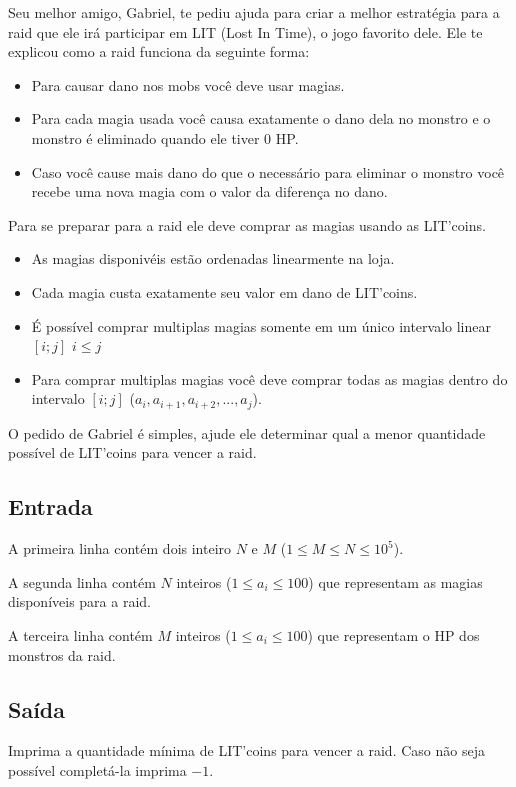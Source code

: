 Seu melhor amigo, Gabriel, te pediu ajuda para criar a melhor estratégia para a raid que ele irá participar em LIT (Lost In Time), o jogo favorito dele. Ele te explicou como a raid funciona da seguinte forma:

\begin{itemize}
    \item Para causar dano nos mobs você deve usar magias.
    \item Para cada magia usada você causa exatamente o dano dela no monstro e o monstro é eliminado quando ele tiver 0 HP.
    \item Caso você cause mais dano do que o necessário para eliminar o monstro você recebe uma nova magia com o valor da diferença no dano.
\end{itemize}

Para se preparar para a raid ele deve comprar as magias usando as LIT'coins.
\begin{itemize}
    \item As magias disponivéis estão ordenadas linearmente na loja.
    \item Cada magia custa exatamente seu valor em dano de LIT'coins.
    \item É possível comprar multiplas magias somente em um único intervalo linear $[i; j]$ $i \leq j$
    \item Para comprar multiplas magias você deve comprar todas as magias dentro do intervalo $[i; j]$ ($a_i, a_{i+1}, a_{i+2}, ..., a_j$).
\end{itemize}

O pedido de Gabriel é simples, ajude ele determinar qual a menor quantidade possível de LIT'coins para vencer a raid.

\subsection*{Entrada}
A primeira linha contém dois inteiro $N$ e $M$ ($1 \leq M \leq N \leq 10^5$).

A segunda linha contém $N$ inteiros ($1 \leq a_i \leq 100$) que representam as magias disponíveis para a raid.

A terceira linha contém $M$ inteiros ($1 \leq a_i \leq 100$) que representam o HP dos monstros da raid.

\subsection*{Saída}
Imprima a quantidade mínima de LIT'coins para vencer a raid. Caso não seja possível completá-la imprima $-1$.

